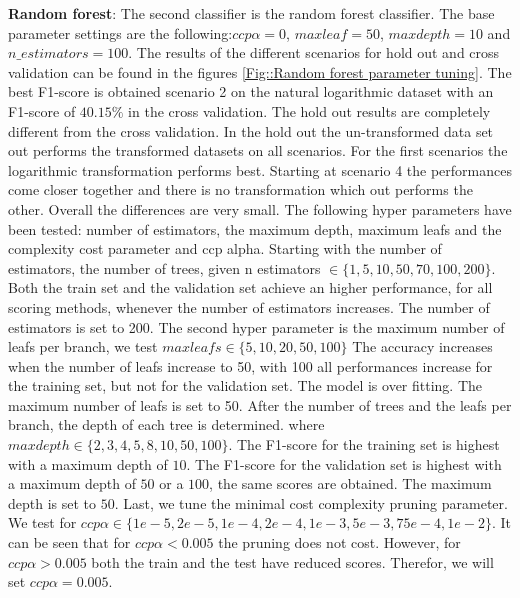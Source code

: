 \documentclass[11pt]{article}
\begin{document}
%
\newline
\textbf{Random forest}: The second classifier is the random forest classifier. The base parameter settings are the following:$ccp \alpha = 0$, $max leaf = 50$, $max depth = 10$ and
$n\_estimators = 100$. The results of the different scenarios for hold out and cross validation can be found in the figures \ref{Fig::Random forest parameter tuning}. The best F1-score is obtained scenario 2 on the natural logarithmic dataset with an F1-score of $40.15\%$ in the cross validation. The hold out results are completely different from the cross validation. In the hold out the un-transformed data set out performs the transformed datasets on all scenarios. For the first scenarios the logarithmic transformation performs best. Starting at scenario 4 the performances come closer together and there is no transformation which out performs the other. Overall the differences are very small.
\newline
The following hyper parameters have been tested: number of estimators, the maximum depth, maximum leafs and the complexity cost parameter and ccp alpha. Starting with the number of estimators, the number of trees, given n estimators $\in \{1,5,10, 50, 70, 100, 200\}$. 
\newline
Both the train set and the validation set achieve an higher performance, for all scoring methods, whenever the number of estimators increases. The number of estimators is set to 200.
\newline
The second hyper parameter is the maximum number of leafs per branch, we test $max leafs \in \{5,10, 20, 50, 100\}$ The accuracy increases when the number of leafs increase to 50, with 100 all performances increase for the training set, but not for the validation set. The model is over fitting. The maximum number of leafs is set to 50.   
\newline
After the number of trees and the leafs per branch, the depth of each tree is determined. where $max depth \in \{2, 3, 4, 5, 8, 10, 50, 100\}$. The F1-score for the training set is highest with a maximum depth of $10$. The F1-score for the validation set is highest with a maximum depth of $50$ or a $100$, the same scores are obtained. The maximum depth is set to $50$. 
\newline
Last, we tune the minimal cost complexity pruning parameter. We test for $ccp  \alpha \in \{1e-5, 2e-5, 1e-4, 2e-4, 1e-3, 5e-3, 75e-4, 1e-2\}$. It can be seen that for $ccp \alpha < 0.005$ the pruning does not cost. However, for $ccp \alpha > 0.005$ both the train and the test have reduced scores. Therefor, we will set $ccp \alpha=0.005$.   
\end{document}
